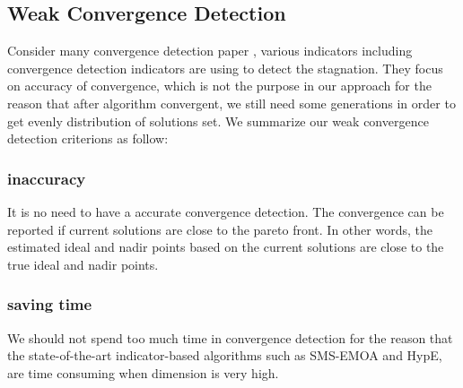 \documentclass[conference]{IEEEtran}
\begin{document}
%
%
%
\subsection{Weak Convergence Detection}
Consider many convergence detection paper \cite{convergenceDetection},
various indicators including convergence detection indicators are using to detect the stagnation.
They focus on accuracy of convergence, which is not the purpose in our approach for 
the reason that after algorithm convergent, we still need some generations in order to
get evenly distribution of solutions set. 
We summarize our weak convergence detection criterions as follow:
\subsubsection{inaccuracy} It is no need to have a accurate convergence detection. 
The convergence can be reported if current solutions are close to the pareto front.
In other words, the estimated ideal and nadir points based on the current solutions
are close to the true ideal and nadir points. 
\subsubsection{saving time} We should not spend too much time in convergence detection
for the reason that the state-of-the-art indicator-based algorithms such as SMS-EMOA and HypE, 
are time consuming when dimension is very high. 
\end{document}
